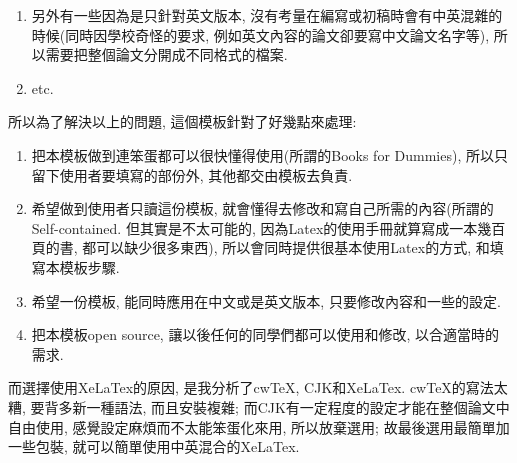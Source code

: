 \begin{enumerate}
{\begin{enumerate}
      \item
      {
        另外有一些因為是只針對英文版本, 沒有考量在編寫或初稿時會有中英混雜的時候(同時因學校奇怪的要求, 例如英文內容的論文卻要寫中文論文名字等), 所以需要把整個論文分開成不同格式的檔案.
      } %

      \item
      {
        etc.
      } %
    \end{enumerate}
  } %
\end{enumerate}


所以為了解決以上的問題, 這個模板針對了好幾點來處理:

\begin{enumerate}

  \item
  {
    把本模板做到連笨蛋都可以很快懂得使用(所謂的Books for Dummies), 所以只留下使用者要填寫的部份外, 其他都交由模板去負責.
  } %

  \item
  {
    希望做到使用者只讀這份模板, 就會懂得去修改和寫自己所需的內容(所謂的Self-contained. 但其實是不太可能的, 因為Latex的使用手冊就算寫成一本幾百頁的書, 都可以缺少很多東西), 所以會同時提供很基本使用Latex的方式, 和填寫本模板步驟.
  } %

  \item
  {
    希望一份模板, 能同時應用在中文或是英文版本, 只要修改內容和一些的設定.
  } %

  \item
  {
    把本模板open source, 讓以後任何的同學們都可以使用和修改, 以合適當時的需求.
  } %

\end{enumerate}

而選擇使用XeLaTex的原因, 是我分析了cwTeX, CJK和XeLaTex.
cwTeX的寫法太糟, 要背多新一種語法, 而且安裝複雜; 而CJK有一定程度的設定才能在整個論文中自由使用, 感覺設定麻煩而不太能笨蛋化來用, 所以放棄選用; 故最後選用最簡單加一些包裝, 就可以簡單使用中英混合的XeLaTex.


